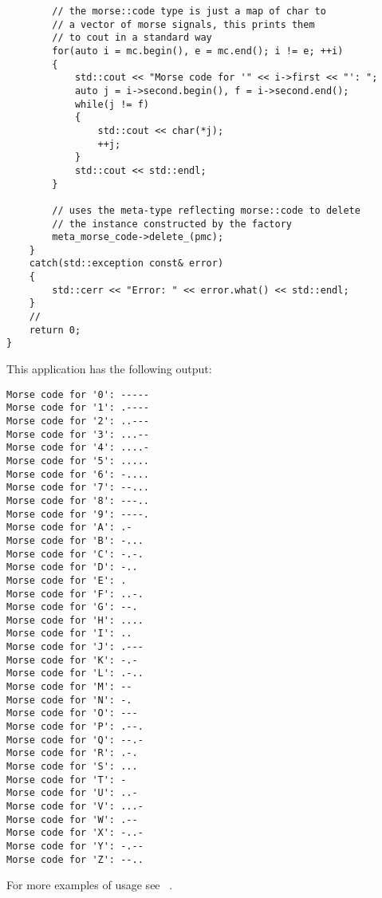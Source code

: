 \begin{lstlisting}
        // the morse::code type is just a map of char to
        // a vector of morse signals, this prints them
        // to cout in a standard way
        for(auto i = mc.begin(), e = mc.end(); i != e; ++i)
        {
            std::cout << "Morse code for '" << i->first << "': ";
            auto j = i->second.begin(), f = i->second.end();
            while(j != f)
            {
                std::cout << char(*j);
                ++j;
            }
            std::cout << std::endl;
        }

        // uses the meta-type reflecting morse::code to delete
        // the instance constructed by the factory
        meta_morse_code->delete_(pmc);
    }
    catch(std::exception const& error)
    {
        std::cerr << "Error: " << error.what() << std::endl;
    }
    //
    return 0;
}
\end{lstlisting}

This application has the following output:

\begin{verbatim}
Morse code for '0': -----
Morse code for '1': .----
Morse code for '2': ..---
Morse code for '3': ...--
Morse code for '4': ....-
Morse code for '5': .....
Morse code for '6': -....
Morse code for '7': --...
Morse code for '8': ---..
Morse code for '9': ----.
Morse code for 'A': .-
Morse code for 'B': -...
Morse code for 'C': -.-.
Morse code for 'D': -..
Morse code for 'E': .
Morse code for 'F': ..-.
Morse code for 'G': --.
Morse code for 'H': ....
Morse code for 'I': ..
Morse code for 'J': .---
Morse code for 'K': -.-
Morse code for 'L': .-..
Morse code for 'M': --
Morse code for 'N': -.
Morse code for 'O': ---
Morse code for 'P': .--.
Morse code for 'Q': --.-
Morse code for 'R': .-.
Morse code for 'S': ...
Morse code for 'T': -
Morse code for 'U': ..-
Morse code for 'V': ...-
Morse code for 'W': .--
Morse code for 'X': -..-
Morse code for 'Y': -.--
Morse code for 'Z': --..
\end{verbatim}

For more examples of usage see ~\cite{mirror-doc-lagoon-examples}.
